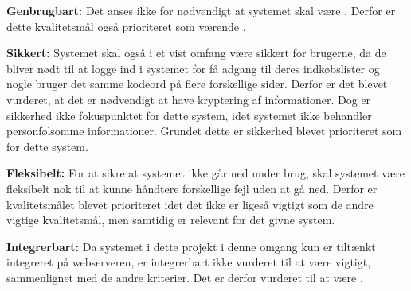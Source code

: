 \textbf{Genbrugbart:}
Det anses ikke for nødvendigt at systemet skal være . Derfor er dette kvalitetsmål også prioriteret som værende .

\textbf{Sikkert:}
Systemet skal også i et vist omfang være sikkert for brugerne, da de bliver nødt til at logge ind i systemet for få adgang til deres indkøbslister og nogle bruger det samme kodeord på flere forskellige sider. Derfor er det blevet vurderet, at det er nødvendigt at have kryptering af  informationer. Dog er sikkerhed ikke fokuspunktet for dette system, idet systemet ikke behandler personfølsomme informationer. Grundet dette er sikkerhed blevet prioriteret som  for dette system.

\textbf{Fleksibelt:}
For at sikre at systemet ikke går ned under brug, skal systemet være fleksibelt nok til at kunne håndtere forskellige fejl uden at gå ned. Derfor er  kvalitetsmålet blevet prioriteret  idet det ikke er ligeså vigtigt som de andre vigtige kvalitetsmål, men samtidig er relevant for det givne system.

\textbf{Integrerbart:}
Da systemet i dette projekt i denne omgang kun er tiltænkt integreret på webserveren, er integrerbart ikke vurderet til at være vigtigt, sammenlignet med de andre kriterier. Det er derfor vurderet til at være .